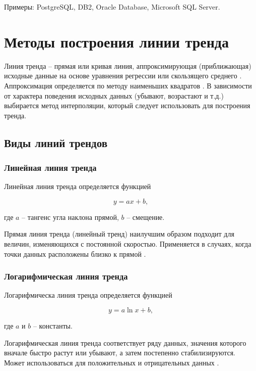 \documentclass[a4paper,14pt]{extreport}
\begin{document}
Примеры: PostgreSQL, DB2, Oracle Database, Microsoft SQL Server.


\section{Методы построения линии тренда}

Линия тренда -- прямая или кривая линия, аппроксимирующая (приближающая) исходные данные на основе уравнения регрессии или скользящего среднего \cite{lt_exel}. Аппроксимация определяется по ме­тоду наименьших квадратов \cite{mnk}. В зависимости от характера поведения исходных данных (убыва­ют, возрастают и т.д.) выбирается метод интерполяции, который сле­дует использовать для построения тренда.

\subsection{Виды линий трендов}

\subsubsection*{Линейная линия тренда}

Линейная линия тренда определяется функцией

\begin{equation}
	y = ax + b,
\end{equation}

где $a$ -- тангенс угла наклона прямой, $b$ -- смещение.

Прямая линия тренда (линейный тренд) наилучшим образом подходит для величин, изменяющихся с постоянной скоростью. Приме­няется в случаях, когда точки данных расположены близко к прямой \cite{lt_exel}.

\subsubsection*{Логарифмическая линия тренда}

Логарифмическа линия тренда определяется функцией

\begin{equation}
	y = a\ln x + b,
\end{equation}

где $a$ и $b$ -- константы.

Логарифмическая линия тренда соответствует ряду данных, значения которого вначале быстро растут или убывают, а затем постепенно стабилизируются. Может использоваться для положительных и отрицательных данных \cite{lt_exel}.
\end{document}
